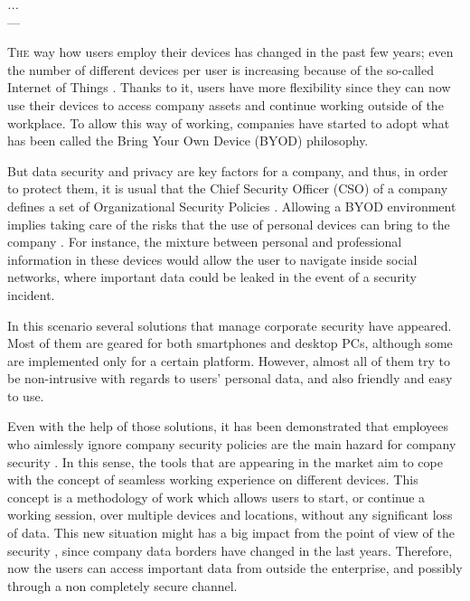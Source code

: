 \label{chap:byodSotA} 

\begin{flushright}{\slshape
   ... } \\ \medskip
    --- {}
\end{flushright}

\minitoc\mtcskip
\vfill

\lettrine{T}{he} way how users employ their devices has changed in the past few years; even the number of different devices per user is increasing because of the so-called Internet of Things \cite{weber2010internet}. Thanks to it, users have more flexibility since they can now use their devices to access company assets and continue working outside of the workplace. To allow this way of working, companies have started to adopt what has been called the Bring Your Own Device (BYOD) philosophy.

But data security and privacy are key factors for a company, and thus, in order to protect them, it is usual that the Chief Security Officer (CSO) of a company defines a set of Organizational Security Policies \cite{Opp_Security11}. Allowing a BYOD environment implies taking care of the risks that the use of personal devices can bring to
the company \cite{gangula2013survey}. For instance, the mixture between personal and professional information in these devices would allow the user to navigate inside social networks, where important data could be leaked in the event of a security incident.  

In this scenario several solutions that manage corporate security have appeared. Most of them are geared for both smartphones and desktop PCs, although some are implemented only for a certain platform. However, almost all of them try to be non-intrusive with regards to users' personal data, and also friendly and easy to use.

Even with the help of those solutions, it has been demonstrated that employees who aimlessly ignore company security policies are the main hazard for company security \cite{Adams_Users05}. In this sense, the tools that are appearing in the market aim to cope with the concept of seamless working experience on different devices. This concept is a methodology of work which allows users to start, or continue a working session, over multiple devices and locations, without any significant loss of data. This new situation might has a big impact from the point of view of the security \cite{Schu_SecPatterns05}, since company data borders have changed in the last years. Therefore, now the users can access important data from outside the enterprise, and possibly through a non completely secure channel.

